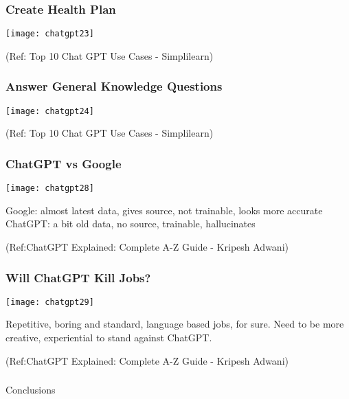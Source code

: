 \begin{frame}[fragile]\frametitle{Create Health Plan}
\begin{center}
\texttt{[image: chatgpt23]}
\end{center}

{\tiny (Ref: Top 10 Chat GPT Use Cases - Simplilearn)}
\end{frame}

\begin{frame}[fragile]\frametitle{Answer General Knowledge Questions}
\begin{center}
\texttt{[image: chatgpt24]}
\end{center}

{\tiny (Ref: Top 10 Chat GPT Use Cases - Simplilearn)}
\end{frame}

\begin{frame}[fragile]\frametitle{ChatGPT vs Google}


\begin{center}
\texttt{[image: chatgpt28]}
\end{center}		

Google: almost latest data, gives source, not trainable, looks more accurate
ChatGPT: a bit old data, no source, trainable, hallucinates

\tiny{(Ref:ChatGPT Explained: Complete A-Z Guide - Kripesh Adwani)}
\end{frame}

\begin{frame}[fragile]\frametitle{Will ChatGPT Kill Jobs?}


\begin{center}
\texttt{[image: chatgpt29]}
\end{center}		

Repetitive, boring and standard, language based jobs, for sure.
Need to be more creative, experiential to stand against ChatGPT.

\tiny{(Ref:ChatGPT Explained: Complete A-Z Guide - Kripesh Adwani)}
\end{frame}

\begin{frame}[fragile]\frametitle{}
\begin{center}
{\Large Conclusions}
\end{center}
\end{frame}




